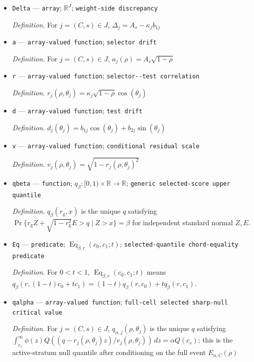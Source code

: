 \documentclass{article}
\begin{document}
\begin{itemize}
  \item \texttt{Delta} --- \texttt{array}; \(\mathbb{R}^{J}\); \texttt{weight-\allowbreak{}side discrepancy}
  \par\smallskip\noindent\emph{Definition.} For \(j=(C,s)\in J\), \(\Delta_j=A_s-\kappa_j b_{1j}\)
  \item \texttt{a} --- \texttt{array-\allowbreak{}valued function}; \texttt{selector drift}
  \par\smallskip\noindent\emph{Definition.} For \(j=(C,s)\in J\), \(a_j(\rho)=A_s\sqrt{1-\rho}\)
  \item \texttt{r} --- \texttt{array-\allowbreak{}valued function}; \texttt{selector-\allowbreak{}-\allowbreak{}test correlation}
  \par\smallskip\noindent\emph{Definition.} \(r_j(\rho,\theta_j)=\kappa_j\sqrt{1-\rho}\cos(\theta_j)\)
  \item \texttt{d} --- \texttt{array-\allowbreak{}valued function}; \texttt{test drift}
  \par\smallskip\noindent\emph{Definition.} \(d_j(\theta_j)=b_{1j}\cos(\theta_j)+b_{2j}\sin(\theta_j)\)
  \item \texttt{v} --- \texttt{array-\allowbreak{}valued function}; \texttt{conditional residual scale}
  \par\smallskip\noindent\emph{Definition.} \(v_j(\rho,\theta_j)=\sqrt{1-r_j(\rho,\theta_j)^2}\)
  \item \texttt{qbeta} --- \texttt{function}; \(q_{\beta}:[0,1)\times\mathbb R\to\mathbb R\); \texttt{generic selected-\allowbreak{}score upper quantile}
  \par\smallskip\noindent\emph{Definition.} \(q_{\beta}(r_{\mathrm g},x)\) is the unique \(q\) satisfying \(\Pr\{r_{\mathrm g}Z+\sqrt{1-r_{\mathrm g}^2}E>q\mid Z>x\}=\beta\) for independent standard normal \(Z,E\).
  \item \texttt{Eq} --- \texttt{predicate}; \(\operatorname{Eq}_{\beta,r}(c_0,c_1;t)\); \texttt{selected-\allowbreak{}quantile chord-\allowbreak{}equality predicate}
  \par\smallskip\noindent\emph{Definition.} For \(0<t<1\), \(\operatorname{Eq}_{\beta,r}(c_0,c_1;t)\) means \(q_{\beta}(r,(1-t)c_0+tc_1)=(1-t)q_{\beta}(r,c_0)+tq_{\beta}(r,c_1)\).
  \item \texttt{qalpha} --- \texttt{array-\allowbreak{}valued function}; \texttt{full-\allowbreak{}cell selected sharp-\allowbreak{}null critical value}
  \par\smallskip\noindent\emph{Definition.} For \(j=(C,s)\in J\), \(q_{\alpha,j}(\rho,\theta_j)\) is the unique \(q\) satisfying \(\int_{c_s}^{\infty}\phi(z)Q((q-r_j(\rho,\theta_j)z)/v_j(\rho,\theta_j))\,dz=\alpha Q(c_s)\); this is the active-stratum null quantile after conditioning on the full event \(E_{n,C}(\rho)\)

\end{itemize}
\end{document}
